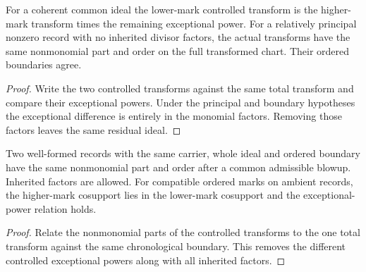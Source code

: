 \begin{theorem}
\label{hir:g8-common-ideal-controlled-orders}
\leanok
For a coherent common ideal the lower-mark controlled
transform is the higher-mark transform times the remaining
exceptional power. For a relatively principal nonzero record
with no inherited divisor factors, the actual transforms have
the same nonmonomial part and order on the full transformed
chart. Their ordered boundaries agree.
\end{theorem}
\begin{proof}
Write the two controlled transforms against the same total
transform and compare their exceptional powers. Under the
principal and boundary hypotheses the exceptional difference
is entirely in the monomial factors. Removing those factors
leaves the same residual ideal.
\end{proof}

\begin{theorem}
\label{hir:g8-common-ideal-inherited-orders}
\leanok
Two well-formed records with the same carrier, whole ideal
and ordered boundary have the same nonmonomial part and
order after a common admissible blowup. Inherited factors
are allowed. For compatible ordered marks on ambient
records, the higher-mark cosupport lies in the lower-mark
cosupport and the exceptional-power relation holds.
\end{theorem}
\begin{proof}
Relate the nonmonomial parts of the controlled transforms
to the one total transform against the same chronological
boundary. This removes the different controlled exceptional
powers along with all inherited factors.
\end{proof}


